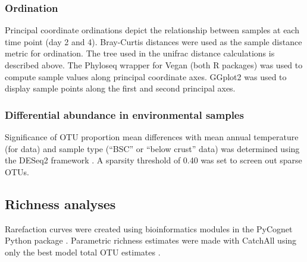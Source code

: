 \subsubsection{Ordination}
Principal coordinate ordinations depict the relationship between samples at
each time point (day 2 and 4). Bray-Curtis distances were
used as the sample distance metric for ordination. The tree used in the unifrac
distance calculations is described above. The Phyloseq \citep{24699258} wrapper
for Vegan \citep{vegan} (both R packages) was used to compute sample values
along principal coordinate axes. GGplot2 \citep{ggplot2} was used to display
sample points along the first and second principal axes.  

\subsubsection{Differential abundance in environmental samples}
Significance of OTU proportion mean differences with mean annual temperature
(for \citet{Garcia_Pichel_2013} data) and sample type (``BSC'' or ``below crust''
\citet{Steven_2013} data) was determined using the DESeq2 framework
\citep{24699258, Love_2014}. A sparsity threshold of 0.40 was set to screen out
sparse OTUs.  

\subsection{Richness analyses} Rarefaction curves were created using
bioinformatics modules in the PyCognet Python package \citep{Knight_2007}.
Parametric richness estimates were made with CatchAll using only the best model
total OTU estimates \citep{BUNGE_2010}.
